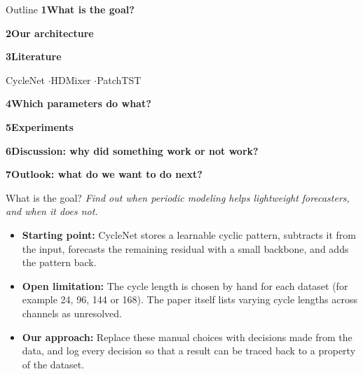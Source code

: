 \documentclass[aspectratio=169]{beamer}
\newcommand{\outlineitem}[2]{%
  \textcolor{accent}{\textbf{#1}}\hspace{0.8em}\textbf{#2}\par\vspace{0.55em}}
\newcommand{\outlinesub}[1]{%
  \hspace{2.1em}\textcolor{muted}{\small #1}\par\vspace{0.25em}}
\begin{document}
\begin{frame}{Outline}
\normalsize
\vspace{0.6em}
\outlineitem{1}{What is the goal?}
\outlineitem{2}{Our architecture}
\outlineitem{3}{Literature}
\outlinesub{CycleNet \quad$\cdot$\quad HDMixer \quad$\cdot$\quad PatchTST}
\vspace{0.3em}
\outlineitem{4}{Which parameters do what?}
\outlineitem{5}{Experiments}
\outlineitem{6}{Discussion: why did something work or not work?}
\outlineitem{7}{Outlook: what do we want to do next?}
\end{frame}

\begin{frame}{What is the goal?}
\small
\textit{Find out when periodic modeling helps lightweight forecasters, and when it does not.}\par
\vspace{0.55em}
{\setlength{\fboxsep}{7pt}\setlength{\fboxrule}{0.45pt}%
\noindent\color{black}}
\vspace{0.75em}
\begin{itemize}
  \setlength{\itemsep}{0.65em}
  \item \textbf{Starting point:} CycleNet stores a learnable cyclic pattern, subtracts it from the input, forecasts the remaining residual with a small backbone, and adds the pattern back.
  \item \textbf{Open limitation:} The cycle length is chosen by hand for each dataset (for example 24, 96, 144 or 168). The paper itself lists varying cycle lengths across channels as unresolved.
  \item \textbf{Our approach:} Replace these manual choices with decisions made from the data, and log every decision so that a result can be traced back to a property of the dataset.
\end{itemize}
\end{frame}
\end{document}
